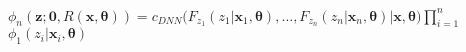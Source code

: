 \documentclass[preview]{standalone}
\begin{document}
\begin{center}
$\phi_n(\boldsymbol{z}; \boldsymbol{0}, R(\boldsymbol{x}, \boldsymbol{\theta}))$$ = $$c_{DNN}(F_{z_1}(z_1 | \boldsymbol{x}_1, \boldsymbol{\theta}), \ldots,  F_{z_n}(z_n | \boldsymbol{x}_n, \boldsymbol{\theta})$$| \boldsymbol{x}, \boldsymbol{\theta})$$\prod_{i=1}^n $$\phi_{1}(z_i| \boldsymbol{x}_i, \boldsymbol{\theta})$
\end{center}
\end{document}
